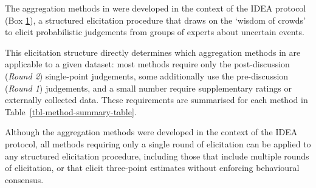 \documentclass[
  11pt,
  a4paper,
]{article}
\begin{document}
The aggregation methods in  were developed in the context
of the IDEA protocol (Box
\hyperref[box-1-the-replicats-idea-protocol]{1}), a structured
elicitation procedure that draws on the `wisdom of crowds' to elicit
probabilistic judgements from groups of experts about uncertain events.

This elicitation structure directly determines which aggregation methods
in  are applicable to a given dataset: most methods
require only the post-discussion (\emph{Round 2}) single-point
judgements, some additionally use the pre-discussion (\emph{Round 1})
judgements, and a small number require supplementary ratings or
externally collected data. These requirements are summarised for each
method in Table~\ref{tbl-method-summary-table}.

Although the aggregation methods were developed in the context of the
IDEA protocol, all methods requiring only a single round of elicitation
can be applied to any structured elicitation procedure, including those
that include multiple rounds of elicitation, or that elicit three-point
estimates without enforcing behavioural consensus.
\end{document}
